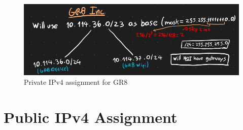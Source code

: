 \documentclass{report}
\begin{document}
\begin{figure}[H]
    \centering
    \includegraphics[width=\textwidth]{private-ipv4-gr8.png}
    \caption{Private IPv4 assignment for GR8}
    \label{fig:private-ipv4-gr8}
\end{figure}

\chapter*{Public IPv4 Assignment}
\end{document}
